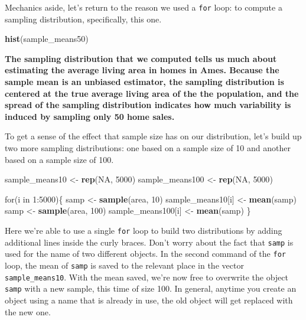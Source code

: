\documentclass[]{book}
\newenvironment{Shaded}{\begin{snugshade}}{\end{snugshade}}
\newcommand{\KeywordTok}[1]{\textcolor[rgb]{0.13,0.29,0.53}{\textbf{{#1}}}}
\newcommand{\DecValTok}[1]{\textcolor[rgb]{0.00,0.00,0.81}{{#1}}}
\newcommand{\StringTok}[1]{\textcolor[rgb]{0.31,0.60,0.02}{{#1}}}
\newcommand{\OtherTok}[1]{\textcolor[rgb]{0.56,0.35,0.01}{{#1}}}
\newcommand{\NormalTok}[1]{{#1}}
\theoremstyle{definition}
\theoremstyle{definition}
\theoremstyle{definition}
\theoremstyle{remark}
\begin{document}
Mechanics aside, let's return to the reason we used a \texttt{for} loop:
to compute a sampling distribution, specifically, this one.

\begin{Shaded}
\begin{Highlighting}[]
\KeywordTok{hist}\NormalTok{(sample_means50)}
\end{Highlighting}
\end{Shaded}

\textbf{The sampling distribution that we computed tells us much about
estimating the average living area in homes in Ames. Because the sample
mean is an unbiased estimator, the sampling distribution is centered at
the true average living area of the the population, and the spread of
the sampling distribution indicates how much variability is induced by
sampling only 50 home sales.}

To get a sense of the effect that sample size has on our distribution,
let's build up two more sampling distributions: one based on a sample
size of 10 and another based on a sample size of 100.

\begin{Shaded}
\begin{Highlighting}[]
\NormalTok{sample_means10 <-}\StringTok{ }\KeywordTok{rep}\NormalTok{(}\OtherTok{NA}\NormalTok{, }\DecValTok{5000}\NormalTok{)}
\NormalTok{sample_means100 <-}\StringTok{ }\KeywordTok{rep}\NormalTok{(}\OtherTok{NA}\NormalTok{, }\DecValTok{5000}\NormalTok{)}

\NormalTok{for(i in }\DecValTok{1}\NormalTok{:}\DecValTok{5000}\NormalTok{)\{}
  \NormalTok{samp <-}\StringTok{ }\KeywordTok{sample}\NormalTok{(area, }\DecValTok{10}\NormalTok{)}
  \NormalTok{sample_means10[i] <-}\StringTok{ }\KeywordTok{mean}\NormalTok{(samp)}
  \NormalTok{samp <-}\StringTok{ }\KeywordTok{sample}\NormalTok{(area, }\DecValTok{100}\NormalTok{)}
  \NormalTok{sample_means100[i] <-}\StringTok{ }\KeywordTok{mean}\NormalTok{(samp)}
\NormalTok{\}}
\end{Highlighting}
\end{Shaded}

Here we're able to use a single \texttt{for} loop to build two
distributions by adding additional lines inside the curly braces. Don't
worry about the fact that \texttt{samp} is used for the name of two
different objects. In the second command of the \texttt{for} loop, the
mean of \texttt{samp} is saved to the relevant place in the vector
\texttt{sample\_means10}. With the mean saved, we're now free to
overwrite the object \texttt{samp} with a new sample, this time of size
100. In general, anytime you create an object using a name that is
already in use, the old object will get replaced with the new one.
\end{document}
